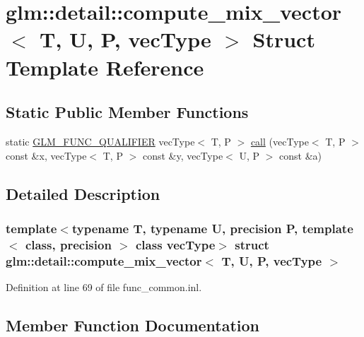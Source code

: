 \hypertarget{structglm_1_1detail_1_1compute__mix__vector}{}\section{glm\+:\+:detail\+:\+:compute\+\_\+mix\+\_\+vector$<$ T, U, P, vec\+Type $>$ Struct Template Reference}
\label{structglm_1_1detail_1_1compute__mix__vector}
\subsection*{Static Public Member Functions}
\begin{DoxyCompactItemize}
\item 
static \hyperlink{setup_8hpp_a33fdea6f91c5f834105f7415e2a64407}{G\+L\+M\+\_\+\+F\+U\+N\+C\+\_\+\+Q\+U\+A\+L\+I\+F\+I\+ER} vec\+Type$<$ T, P $>$ \hyperlink{structglm_1_1detail_1_1compute__mix__vector_a68153ea8943ca1ffac025040a197c590}{call} (vec\+Type$<$ T, P $>$ const \&x, vec\+Type$<$ T, P $>$ const \&y, vec\+Type$<$ U, P $>$ const \&a)
\end{DoxyCompactItemize}


\subsection{Detailed Description}
\subsubsection*{template$<$typename T, typename U, precision P, template$<$ class, precision $>$ class vec\+Type$>$\newline
struct glm\+::detail\+::compute\+\_\+mix\+\_\+vector$<$ T, U, P, vec\+Type $>$}



Definition at line 69 of file func\+\_\+common.\+inl.



\subsection{Member Function Documentation}
\mbox{\label{structglm_1_1detail_1_1compute__mix__vector_a68153ea8943ca1ffac025040a197c590}} 
